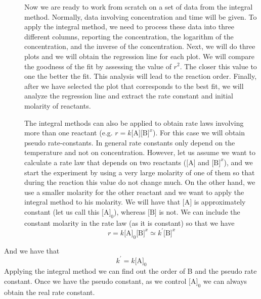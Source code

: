 \documentclass[main.tex]{subfiles}
\begin{document}
\begin{description}
\item[] 
Now we are ready to work from scratch on a set of data from the integral method. Normally, data involving concentration and time will be given. To apply the integral method, we need to process these data into three different columns, reporting the concentration, the logarithm of the concentration, and the inverse of the concentration. Next, we will do three plots and we will obtain the regression line for each plot. We will compare the goodness of the fit by assessing the value of $r^2$. The closer this value to one the better the fit. This analysis will lead to the reaction order. Finally, after we have selected the plot that corresponds to the best fit, we will analyze the regression line and extract the rate constant and initial molarity of reactants. 

\item[] 
The integral methods can also be applied to obtain rate laws involving more than one reactant (e.g. $r=k\text{[A]}\text{[B]}^x$). For this case we will obtain pseudo rate-constants. In general rate constants only depend on the temperature and not on concentration. However, let us assume we want to calculate a rate law that depends on two reactants ($\text{[A]}$ and $\text{[B]}^x$), and we start the experiment by using a very large molarity of one of them so that during the reaction this value do not change much. On the other hand, we use a smaller molarity for the other  reactant and we want to apply the integral method to his molarity. We will have that $\text{[A]}$ is approximately constant (let us call this $\text{[A]}_0$), whereas $\text{[B]}$ is not. We can include the constant molarity in the rate law (as it is constant) so that we have 
\[r=k\text{[A]}_0\text{[B]}^x \simeq k^\prime \text{[B]}^x\]
\end{description}
And we have that 
\[ k^\prime=k\text{[A]}_0\]
Applying the integral method we can find out the order of B and the pseudo rate constant. Once we have the pseudo constant, as we control $\text{[A]}_0$ we can always obtain the real rate constant.
\end{document}
